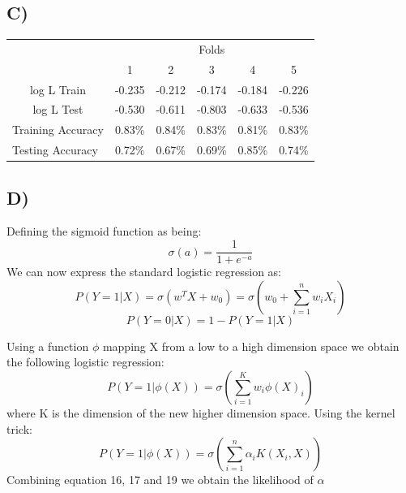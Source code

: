 \documentclass{report}
\begin{document}
\subsection*{C)}
\begin{center}
\begin{table}[h]
 \begin{tabular}{l|c|c|c|c|c|}
 \cline{2-6}
     & \multicolumn{5}{c|}{Folds}      \\ \cline{2-6}
     &  1  &  2  &  3  &  4  &  5 \\ \hline
\multicolumn{1}{|c|}{log L Train} & -0.235 & -0.212 & -0.174 & -0.184 & -0.226  \\ \hline
\multicolumn{1}{|c|}{log L Test} & -0.530 & -0.611 & -0.803 & -0.633 & -0.536  \\ \hline
\multicolumn{1}{|l|}{Training Accuracy} & 0.83\% & 0.84\% & 0.83\% & 0.81\% & 0.83\% \\ \hline
\multicolumn{1}{|l|}{Testing Accuracy} & 0.72\% & 0.67\% & 0.69\% & 0.85\% & 0.74\% \\ \hline
\end{tabular}
\end{table}
\end{center}
\subsection*{D)}
Defining the sigmoid function as being:
\begin{equation}
  \sigma(a) = \frac{1}{1+e^{-a}}
\end{equation}
We can now express the standard logistic regression as:
\begin{equation}
  P(Y = 1 | X) = \sigma(w^TX + w_0) = \sigma(w_0 + \sum_{i=1}^{n}w_iX_i)
\end{equation}
\begin{equation}
  P(Y = 0 | X) = 1 - P(Y = 1 | X)
\end{equation}

Using a function $\phi$ mapping X from a low to a high dimension space we obtain
the following logistic regression:
\begin{equation}
  P(Y = 1 | \phi(X)) = \sigma(\sum_{i=1}^{K}w_i\phi(X)_i)
\end{equation}
where K is the dimension of the new higher dimension space.
Using the kernel trick:
\begin{equation}
  P(Y = 1 | \phi(X)) = \sigma(\sum_{i=1}^{n}\alpha_iK(X_i,X))
\end{equation}
Combining equation 16, 17 and 19 we obtain the likelihood of $\alpha$
\end{document}
